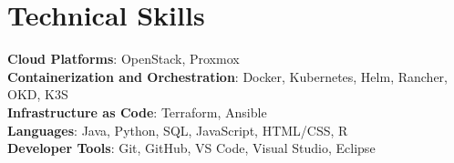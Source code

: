 \documentclass[letterpaper,11pt]{article}
\begin{document}
%
\section{Technical Skills}
 \begin{itemize}[leftmargin=0.15in, label={}]
    \small{\item{
     \textbf{Cloud Platforms}{: OpenStack, Proxmox} \\
     \textbf{Containerization and Orchestration}{: Docker, Kubernetes, Helm, Rancher, OKD, K3S} \\
     \textbf{Infrastructure as Code}{: Terraform, Ansible} \\
     \textbf{Languages}{: Java, Python, SQL, JavaScript, HTML/CSS, R} \\
     \textbf{Developer Tools}{: Git, GitHub, VS Code, Visual Studio, Eclipse}
    }}
 \end{itemize}


\end{document}
